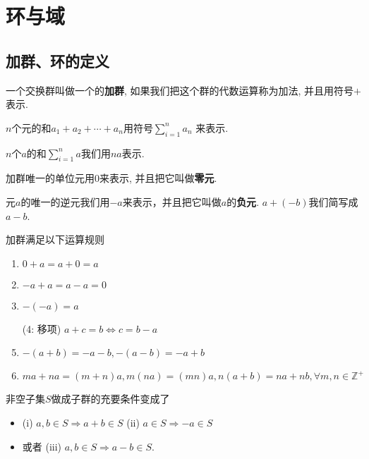 \section{环与域}

\subsection{加群、环的定义}

\begin{Definition}[加群]
一个交换群叫做一个的\textbf{加群}, 如果我们把这个群的代数运算称为加法, 并且用符号$+$表示.
\end{Definition}

\begin{Definition}[$\Sigma$]
{{
$n$个元的和$a_1 + a_2 + \cdots + a_n$用符号$\displaystyle \sum_{i=1}^{n} a_n$ 来表示.
}
}
\end{Definition}

\begin{Definition}
$n$个$a$的和$\displaystyle \sum_{i=1}^{n} a$我们用$na$表示.
\end{Definition}

\begin{Definition}[零元]
加群唯一的单位元用$\mathfrak{0}$来表示, 并且把它叫做\textbf{零元}.
\end{Definition}

\begin{Definition}[负元]
元$a$的唯一的逆元我们用$-a$来表示，并且把它叫做$a$的\textbf{负元}. $a + (-b)$我们简写成$a - b$.
\end{Definition}

\begin{Theorem}
加群满足以下运算规则
\begin{enumerate}[(1)]
\item $\mathfrak{0} + a = a + \mathfrak{0} = a$
\item $-a + a = a - a = \mathfrak{0}$
\item $-(-a) = a$
\item[(4: 移项)] $a + c = b \Leftrightarrow c = b - a$
\item $-(a +b) = -a - b, -(a-b) = -a +b$
\item $ma + na = (m+n)a, m(na) = (mn)a, n(a+b) = na + nb, \forall m, n \in \mathbb{Z}^+$
\end{enumerate}
\end{Theorem}

\begin{Note}
非空子集$S$做成子群的充要条件变成了 
\begin{itemize}
\item (i) $a, b \in S \Rightarrow a+b \in S$ (ii) $a \in S \Rightarrow -a \in S$
\item 或者 (iii) $a, b \in S \Rightarrow a - b \in S$.
\end{itemize}
\end{Note}

